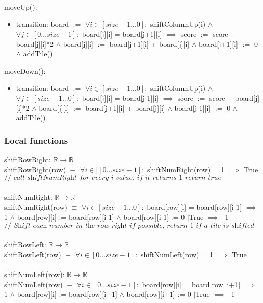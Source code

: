 \documentclass[12pt]{article}
\begin{document}
moveUp(): 
\begin{itemize}
    \item transition: board $:=$ $\forall i \in [size-1...0]:$ shiftColumnUp(i) $\land$ $\forall j \in [0...size-1]:$ board[j][i] = board[j+1][i] $\implies$ score $:=$ score + board[j][i]*2 $\land$ board[j][i] $:=$ board[j+1][i] + board[j][i] $\land$ board[j+1][i] $:=$ 0 $\land$ addTile()
\end{itemize}
moveDown(): 
\begin{itemize}
    \item transition: board $:=$ $\forall i \in [size-1...0]:$ shiftColumnUp(i) $\land$ $\forall j \in [size-1...0]:$ board[j][i] = board[j-1][i] $\implies$ score $:=$ score + board[j][i]*2 $\land$ board[j][i] $:=$ board[j+1][i] + board[j][i] $\land$ board[j-1][i] $:=$ 0 $\land$ addTile()
\end{itemize}
\subsubsection* {Local functions}

shiftRowRight: $\mathbb{R} \rightarrow \mathbb{B}$\\
shiftRowRight(row) $\equiv$ $\forall i \in|[0...size-1]:$ shiftNumRight(row) = 1 $\implies$ True \\ $\textit{// call shiftNumRight for every i value, if it returns 1 return true}$ \\\\

\noindent shiftNumRight: $\mathbb{R} \rightarrow \mathbb{R}$\\
shiftNumRight(row) $\equiv$ $\forall i \in[size-1...0]:$ board[row][i] = board[row][i-1] $\implies$ 1 $\land$ board[row][i] := board[row][i-1] $\land$ board[row][i-1] := 0 $|$True $\implies$ -1 \\
$\textit{// Shift each number in the row right if possible, return 1 if a tile is shifted}$\\\\

\noindent shiftRowLeft: $\mathbb{R} \rightarrow \mathbb{B}$\\
shiftRowLeft(row) $\equiv$ $\forall i \in [0...size-1]:$ shiftNumLeft(row) = 1 $\implies$ True \\\\

\noindent shiftNumLeft(row):  $\mathbb{R} \rightarrow \mathbb{R}$\\
shiftNumLeft(row) $\equiv$ $\forall i \in [0...size-1]:$ board[row][i] = board[row][i+1] $\implies$ 1 $\land$ board[row][i] := board[row][i+1] $\land$ board[row][i+1] := 0 $|$True $\implies$ -1 \\\\
\end{document}

